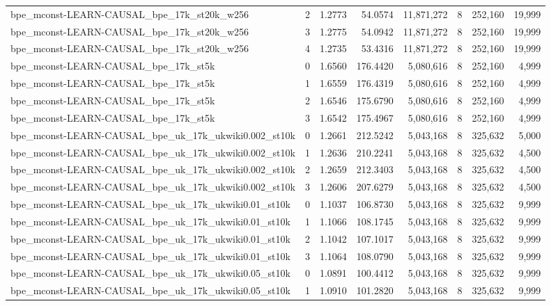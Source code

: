 \begin{tabular}{lrrrrrrr}
bpe\_mconst-LEARN-CAUSAL\_bpe\_17k\_st20k\_w256 & 2 & 1.2773 & 54.0574 & 11,871,272 & 8 & 252,160 & 19,999 \\
bpe\_mconst-LEARN-CAUSAL\_bpe\_17k\_st20k\_w256 & 3 & 1.2775 & 54.0942 & 11,871,272 & 8 & 252,160 & 19,999 \\
bpe\_mconst-LEARN-CAUSAL\_bpe\_17k\_st20k\_w256 & 4 & 1.2735 & 53.4316 & 11,871,272 & 8 & 252,160 & 19,999 \\
bpe\_mconst-LEARN-CAUSAL\_bpe\_17k\_st5k & 0 & 1.6560 & 176.4420 & 5,080,616 & 8 & 252,160 & 4,999 \\
bpe\_mconst-LEARN-CAUSAL\_bpe\_17k\_st5k & 1 & 1.6559 & 176.4319 & 5,080,616 & 8 & 252,160 & 4,999 \\
bpe\_mconst-LEARN-CAUSAL\_bpe\_17k\_st5k & 2 & 1.6546 & 175.6790 & 5,080,616 & 8 & 252,160 & 4,999 \\
bpe\_mconst-LEARN-CAUSAL\_bpe\_17k\_st5k & 3 & 1.6542 & 175.4967 & 5,080,616 & 8 & 252,160 & 4,999 \\
bpe\_mconst-LEARN-CAUSAL\_bpe\_uk\_17k\_ukwiki0.002\_st10k & 0 & 1.2661 & 212.5242 & 5,043,168 & 8 & 325,632 & 5,000 \\
bpe\_mconst-LEARN-CAUSAL\_bpe\_uk\_17k\_ukwiki0.002\_st10k & 1 & 1.2636 & 210.2241 & 5,043,168 & 8 & 325,632 & 4,500 \\
bpe\_mconst-LEARN-CAUSAL\_bpe\_uk\_17k\_ukwiki0.002\_st10k & 2 & 1.2659 & 212.3403 & 5,043,168 & 8 & 325,632 & 4,500 \\
bpe\_mconst-LEARN-CAUSAL\_bpe\_uk\_17k\_ukwiki0.002\_st10k & 3 & 1.2606 & 207.6279 & 5,043,168 & 8 & 325,632 & 4,500 \\
bpe\_mconst-LEARN-CAUSAL\_bpe\_uk\_17k\_ukwiki0.01\_st10k & 0 & 1.1037 & 106.8730 & 5,043,168 & 8 & 325,632 & 9,999 \\
bpe\_mconst-LEARN-CAUSAL\_bpe\_uk\_17k\_ukwiki0.01\_st10k & 1 & 1.1066 & 108.1745 & 5,043,168 & 8 & 325,632 & 9,999 \\
bpe\_mconst-LEARN-CAUSAL\_bpe\_uk\_17k\_ukwiki0.01\_st10k & 2 & 1.1042 & 107.1017 & 5,043,168 & 8 & 325,632 & 9,999 \\
bpe\_mconst-LEARN-CAUSAL\_bpe\_uk\_17k\_ukwiki0.01\_st10k & 3 & 1.1064 & 108.0790 & 5,043,168 & 8 & 325,632 & 9,999 \\
bpe\_mconst-LEARN-CAUSAL\_bpe\_uk\_17k\_ukwiki0.05\_st10k & 0 & 1.0891 & 100.4412 & 5,043,168 & 8 & 325,632 & 9,999 \\
bpe\_mconst-LEARN-CAUSAL\_bpe\_uk\_17k\_ukwiki0.05\_st10k & 1 & 1.0910 & 101.2820 & 5,043,168 & 8 & 325,632 & 9,999 \\

\end{tabular}
